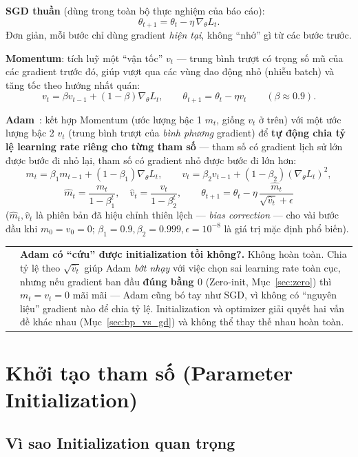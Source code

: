 \documentclass[12pt,a4paper]{article}
\makeatletter
\newenvironment{tructiep}[1][Cách hiểu đơn giản]
  {\par\smallskip\noindent\begin{tabular}{@{}p{0.35em}@{\hspace{6pt}}p{\dimexpr\linewidth-1.9em\relax}@{}}
   \textcolor{boxln}{\rule{2pt}{\baselineskip}} & \textbf{#1.}\enspace\ignorespaces}
  {\end{tabular}\par\smallskip}
\newcommand{\en}[1]{\textit{#1}}
\makeatother
\begin{document}
\textbf{SGD thuần} (dùng trong toàn bộ thực nghiệm của báo cáo):
$$\theta_{t+1} = \theta_t - \eta\,\nabla_\theta L_t.$$
Đơn giản, mỗi bước chỉ dùng gradient \emph{hiện tại}, không ``nhớ'' gì từ
các bước trước.

\textbf{Momentum}: tích luỹ một ``vận tốc'' $v_t$ --- trung bình trượt có
trọng số mũ của các gradient trước đó, giúp vượt qua các vùng dao động
nhỏ (nhiễu batch) và tăng tốc theo hướng nhất quán:
$$v_t = \beta v_{t-1} + (1-\beta)\nabla_\theta L_t, \qquad \theta_{t+1} = \theta_t - \eta v_t \qquad (\beta\approx0.9).$$

\textbf{Adam}~\citep{kingma2015adam}: kết hợp Momentum (ước lượng bậc 1
$m_t$, giống $v_t$ ở trên) với một ước lượng bậc 2 $v_t$ (trung bình trượt
của \emph{bình phương} gradient) để \textbf{tự động chia tỷ lệ learning
rate riêng cho từng tham số} --- tham số có gradient lịch sử lớn được
bước đi nhỏ lại, tham số có gradient nhỏ được bước đi lớn hơn:
$$m_t=\beta_1 m_{t-1}+(1-\beta_1)\nabla_\theta L_t,\qquad
v_t=\beta_2 v_{t-1}+(1-\beta_2)(\nabla_\theta L_t)^2,$$
$$\hat m_t = \frac{m_t}{1-\beta_1^t},\quad \hat v_t=\frac{v_t}{1-\beta_2^t},\qquad
\theta_{t+1}=\theta_t-\eta\,\frac{\hat m_t}{\sqrt{\hat v_t}+\epsilon}$$
($\hat m_t,\hat v_t$ là phiên bản đã hiệu chỉnh thiên lệch --- \en{bias
correction} --- cho vài bước đầu khi $m_0=v_0=0$; $\beta_1{=}0.9,
\beta_2{=}0.999,\epsilon{=}10^{-8}$ là giá trị mặc định phổ biến).

\begin{tructiep}[Adam có ``cứu'' được initialization tồi không?]
Không hoàn toàn. Chia tỷ lệ theo $\sqrt{\hat v_t}$ giúp Adam \emph{bớt
nhạy} với việc chọn sai learning rate toàn cục, nhưng nếu gradient ban đầu
\textbf{đúng bằng $0$} (Zero-init, Mục~\ref{sec:zero}) thì $m_t=v_t=0$
mãi mãi --- Adam cũng bó tay như SGD, vì không có ``nguyên liệu'' gradient
nào để chia tỷ lệ. Initialization và optimizer giải quyết hai vấn đề khác
nhau (Mục~\ref{sec:bp_vs_gd}) và không thể thay thế nhau hoàn toàn.
\end{tructiep}

\section{Khởi tạo tham số (Parameter Initialization)}
\label{sec:init}

\subsection{Vì sao Initialization quan trọng}
\end{document}
